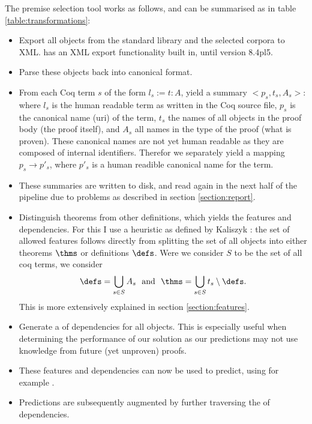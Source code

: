 The premise selection tool works as follows, and can be summarised as in table \ref{table:transformations}:
\begin{itemize}
    \item Export all \coq objects from the standard library and the selected corpora to XML.
		\coq has an XML export functionality built in, until version 8.4pl5.
	\item Parse these objects back into canonical \acic format.
	\item From each Coq term $s$ of the form $l_s := t : A$, yield a summary $<p_s, t_s, A_s>$:
		where $l_s$ is the human readable term as written in the Coq source file, $p_s$ is the canonical name (uri) of the term,
		$t_s$ the names of all objects in the proof body (the proof itself),
		and $A_s$ all names in the type of the proof (what is proven).
		These canonical names are not yet human readable as they are composed of internal identifiers.
		Therefor we separately yield a mapping $p_s \rightarrow p'_s$, where $p'_s$ is a human readible canonical name for the term.
	\item These summaries are written to disk, and read again in the next half of the pipeline due to problems as described in section \ref{section:report}.
	\item Distinguish theorems from other definitions, which yields the features and dependencies.
		For this I use a heuristic as defined by Kaliszyk \cite{kaliszyk2014machine}:
		the set of allowed features follows directly from splitting the set of all objects into either theorems $\thms$ or definitions $\defs$.
		Were we consider $S$ to be the set of all coq terms, we consider
		$$\defs = \bigcup_{s \in S} A_s ~~\text{and}~~ \thms = \bigcup_{s \in S} t_s \setminus \defs \text{.}$$
		This is more extensively explained in section \ref{section:features}.
    \item Generate a \dagraph of dependencies for all \coq objects.
		This is especially useful when determining the performance of our solution as our predictions may not use
		knowledge from future (yet unproven) proofs.
	\item These features and dependencies can now be used to predict, using for example \knn.
	\item Predictions are subsequently augmented by further traversing the \dagraph of dependencies.
\end{itemize}

